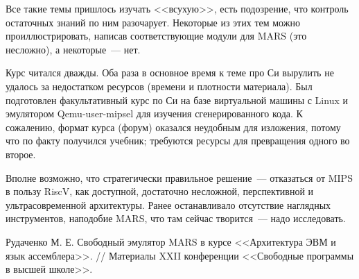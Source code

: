 \documentclass[10pt, a5paper]{article}
\begin{document}
Все такие темы пришлось изучать <<всухую>>, есть подозрение, что контроль остаточных знаний по ним разочарует. Некоторые из этих тем можно проиллюстрировать, написав соответствующие модули для MARS (это несложно), а некоторые~--- нет.

Курс читался дважды. Оба раза в основное время к теме про Си вырулить не удалось за недостатком ресурсов (времени и плотности материала). Был подготовлен факультативный курс по Си на базе виртуальной машины с Linux и эмулятором Qemu-user-mipsel для изучения сгенерированного кода. К сожалению, формат курса (форум) оказался неудобным для изложения, потому что по факту получился учебник; требуются ресурсы для превращения одного во второе.

Вполне возможно, что стратегически правильное решение~--- отказаться от MIPS в пользу RiscV, как доступной, достаточно несложной, перспективной и ультрасовременной архитектуры. Ранее останавливало отсутствие наглядных инструментов, наподобие MARS, что там сейчас творится~--- надо исследовать.

\begin{thebibliography}{20}
 Рудаченко М. Е. Свободный эмулятор MARS в курсе <<Архитектура ЭВМ и язык ассемблера>>. // Материалы XXII конференции <<Свободные программы в высшей школе>>.
\end{thebibliography}
\end{document}
